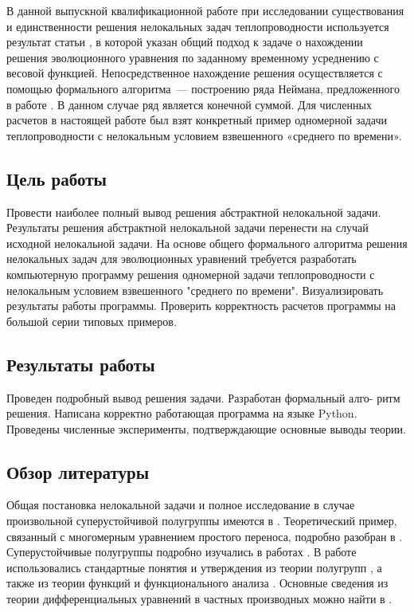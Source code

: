 \documentclass{article}
\theoremstyle{definition}
\begin{document}
В данной выпускной квалификационной работе при исследовании существования и единственности
решения нелокальных задач теплопроводности используется результат статьи \cite{Tikhonov1}, в которой указан общий подход к задаче о нахождении решения эволюционного уравнения по заданному временному усреднению с весовой функцией.
Непосредственное нахождение решения осуществляется с помощью формального алгоритма~--- построению ряда Неймана, предложенного
в работе \cite{Tikhonov1}. В данном случае ряд является конечной суммой. 
Для численных расчетов в настоящей работе был взят конкретный пример
одномерной задачи теплопроводности с нелокальным условием взвешенного «среднего по времени».

\subsection{Цель работы}
Провести наиболее полный вывод решения абстрактной нелокальной задачи. 
Результаты решения абстрактной нелокальной задачи перенести на случай исходной нелокальной задачи.
На основе общего формального алгоритма решения нелокальных задач для эволюционных уравнений требуется разработать компьютерную программу решения одномерной задачи теплопроводности с нелокальным условием взвешенного "среднего по времени". 
Визуализировать результаты работы программы. Проверить корректность расчетов программы на большой серии типовых примеров.

\subsection{Результаты работы}
Проведен подробный вывод решения задачи. Разработан формальный алго-
ритм решения. Написана корректно работающая программа на языке Python. 
Проведены численные эксперименты, подтверждающие основные выводы теории.

\subsection{Обзор литературы}
Общая постановка нелокальной задачи и полное исследование
в случае произвольной суперустойчивой полугруппы имеются в \cite{Tikhonov1}.
Теоретический пример, связанный с многомерным уравнением простого переноса,
подробно разобран в \cite{Tikhonov2}.
Суперустойчивые полугруппы подробно изучались в работах \cite{Balakrishnan_1, Balakrishnan_2}.
В работе использовались стандартные понятия и утверждения из теории полугрупп \cite{Hille_Phillips, Dunford_Schwartz, Pazy},
а также из теории функций и функционального анализа \cite{Kolmogorov_Fomin, Trenogin}.
Основные сведения из теории дифференциальных уравнений в частных производных можно найти в \cite{Filippov}.
\end{document}
